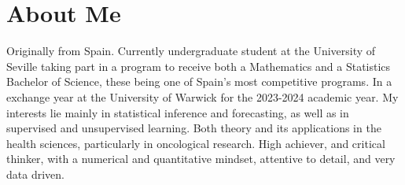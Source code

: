 \section{About Me}
Originally from Spain. Currently undergraduate student at the University of Seville taking part in a program to receive both a Mathematics and a Statistics Bachelor of Science, these being one of Spain's most competitive programs. In a exchange year at the University of  Warwick for the 2023-2024 academic year.
My interests lie mainly in statistical inference and forecasting, as well as in supervised and unsupervised learning. Both theory and its applications in the health sciences, particularly in oncological research.
High achiever, and critical thinker, with a numerical and quantitative mindset, attentive to detail, and very data driven.